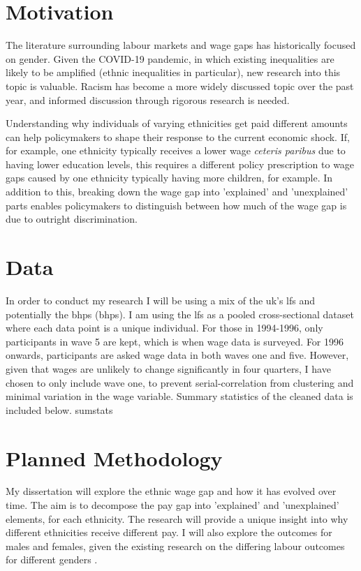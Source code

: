 \documentclass[class=article, crop=false]{standalone}
\begin{document}
\section{Motivation}
The literature surrounding labour markets and wage gaps has historically focused on gender. Given the COVID-19 pandemic, in which existing inequalities are likely to be amplified (ethnic inequalities in particular), new research into this topic is valuable. Racism has become a more widely discussed topic over the past year, and informed discussion through rigorous research is needed.

Understanding why individuals of varying ethnicities get paid different amounts can help policymakers to shape their response to the current economic shock. If, for example, one ethnicity typically receives a lower wage \textit{ceteris paribus} due to having lower education levels, this requires a different policy prescription to wage gaps caused by one ethnicity typically having more children, for example. In addition to this, breaking down the wage gap into 'explained' and 'unexplained' parts enables policymakers to distinguish between how much of the wage gap is due to outright discrimination.

\section{Data}
In order to conduct my research I will be using a mix of the \acrshort{uk}'s \acrfull{lfs} and potentially the \acrlong{bhps} (\acrshort{bhps}). I am using the \acrshort{lfs} as a pooled cross-sectional dataset where each data point is a unique individual. For those in 1994-1996, only participants in wave 5 are kept, which is when wage data is surveyed. For 1996 onwards, participants are asked wage data in both waves one and five. However, given that wages are unlikely to change significantly in four quarters, I have chosen to only include wave one, to prevent serial-correlation from clustering and minimal variation in the wage variable. Summary statistics of the cleaned data is included below.
{sumstats}

\section{Planned Methodology}
My dissertation will explore the ethnic wage gap and how it has evolved over time. The aim is to decompose the pay gap into 'explained' and 'unexplained' elements, for each ethnicity. The research will provide a unique insight into why different ethnicities receive different pay. I will also explore the outcomes for males and females, given the existing research on the differing labour outcomes for different genders \citep{BoE}.
\end{document}

